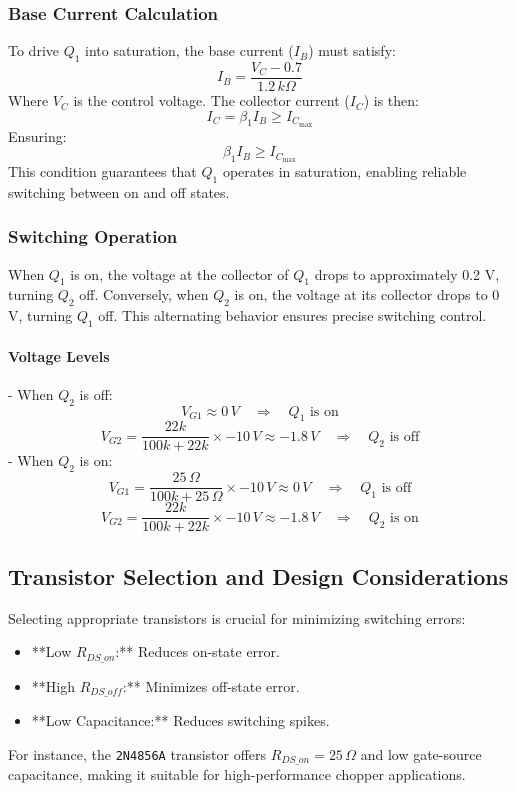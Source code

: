 \subsubsection{Base Current Calculation}
To drive \( Q_1 \) into saturation, the base current (\( I_B \)) must satisfy:
\[
I_B = \frac{V_C - 0.7}{1.2\,k\Omega}
\]
Where \( V_C \) is the control voltage. The collector current (\( I_C \)) is then:
\[
I_C = \beta_1 I_B \geq I_{C_{\text{max}}}
\]
Ensuring:
\[
\beta_1 I_B \geq I_{C_{\text{max}}}
\]
This condition guarantees that \( Q_1 \) operates in saturation, enabling reliable switching between on and off states.

\subsubsection{Switching Operation}
When \( Q_1 \) is on, the voltage at the collector of \( Q_1 \) drops to approximately 0.2 V, turning \( Q_2 \) off. Conversely, when \( Q_2 \) is on, the voltage at its collector drops to 0 V, turning \( Q_1 \) off. This alternating behavior ensures precise switching control.

\paragraph{Voltage Levels}
- When \( Q_2 \) is off:
    \[
    V_{G1} \approx 0\,V \quad \Rightarrow \quad Q_1 \text{ is on}
    \]
    \[
    V_{G2} = \frac{22k}{100k + 22k} \times -10\,V \approx -1.8\,V \quad \Rightarrow \quad Q_2 \text{ is off}
    \]
- When \( Q_2 \) is on:
    \[
    V_{G1} = \frac{25\,\Omega}{100k + 25\,\Omega} \times -10\,V \approx 0\,V \quad \Rightarrow \quad Q_1 \text{ is off}
    \]
    \[
    V_{G2} = \frac{22k}{100k + 22k} \times -10\,V \approx -1.8\,V \quad \Rightarrow \quad Q_2 \text{ is on}
    \]

\subsection{Transistor Selection and Design Considerations}
Selecting appropriate transistors is crucial for minimizing switching errors:
\begin{itemize}
    \item **Low \( R_{DS\_on} \):** Reduces on-state error.
    \item **High \( R_{DS\_off} \):** Minimizes off-state error.
    \item **Low Capacitance:** Reduces switching spikes.
\end{itemize}
For instance, the \texttt{2N4856A} transistor offers \( R_{DS\_on} = 25\,\Omega \) and low gate-source capacitance, making it suitable for high-performance chopper applications.

